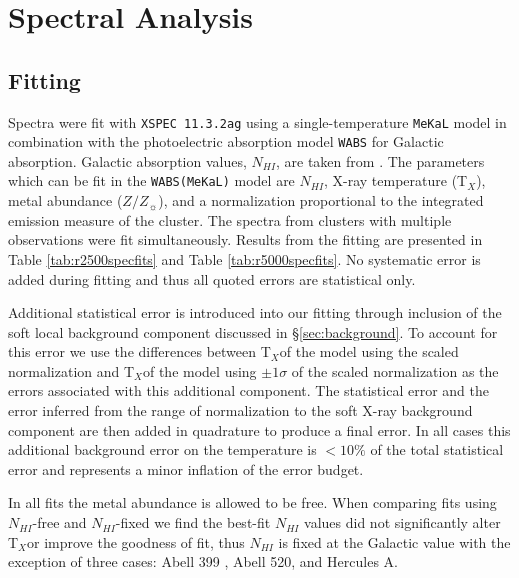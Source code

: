 \documentclass{emulateapj}
\newcommand{\tx}{T$_{X}$}
\begin{document}
\section{Spectral Analysis} \label{sec:specan}

\subsection{Fitting} \label{sec:fitting}

Spectra were fit with {\tt XSPEC 11.3.2ag} \citep{1996ASPC..101...17A}
using a single-temperature {\tt MeKaL} model in combination with the
photoelectric absorption model {\tt WABS} \citep{1983ApJ...270..119M}
for Galactic absorption. Galactic absorption values, $N_{HI}$, are taken from
\cite{1990ARA&A..28..215D}. The parameters which can be fit in the
{\tt WABS(MeKaL)} model are $N_{HI}$, X-ray temperature (\tx),
metal abundance ($Z/Z_{\sun}$), and a normalization proportional to the
integrated emission measure of the cluster. The spectra from
clusters with multiple observations were fit simultaneously. Results
from the fitting are presented in Table \ref{tab:r2500specfits} and
Table \ref{tab:r5000specfits}. No systematic error is added during
fitting and thus all quoted errors are statistical only.

Additional statistical error is introduced into our fitting through
inclusion of the soft local background component discussed in
\S\ref{sec:background}. To account for this error we use the
differences between \tx of the model using the scaled 
normalization and \tx of the model using $\pm1\sigma$ of the
scaled normalization as the errors associated with this additional
component. The statistical error and the error inferred from the range
of normalization to the soft X-ray background component are then
added in quadrature to produce a final error. In all cases this
additional background error on the temperature is $< 10\%$ of the
total statistical error and represents a minor inflation of the error
budget.

In all fits the metal abundance is allowed to be free. When comparing
fits using $N_{HI}$-free and $N_{HI}$-fixed we find the best-fit
$N_{HI}$ values did not significantly alter \tx or improve the
goodness of fit, thus $N_{HI}$ is fixed at the Galactic value with the
exception of three cases: Abell 399 \citep{2004MNRAS.351.1439S},
Abell 520, and Hercules A.
\end{document}
